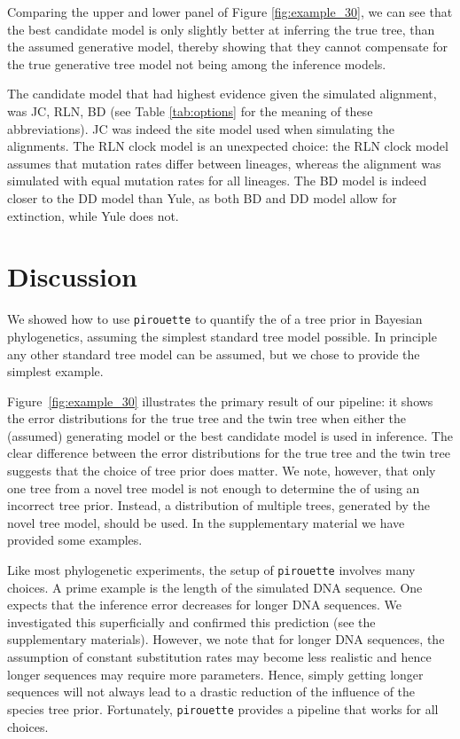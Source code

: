 Comparing the upper and lower panel of Figure \ref{fig:example_30}, 
we can see that the best
candidate model is only slightly better at inferring the true tree,
than the assumed generative model, 
thereby showing that they cannot compensate 
for the true generative tree model not being among the inference models.

The candidate model that had highest evidence given the simulated alignment,
was JC, RLN, BD (see Table \ref{tab:options} for the meaning of these 
abbreviations). JC was indeed the site model used when simulating the
alignments. The RLN clock model is an unexpected choice: the RLN clock
model assumes that mutation rates differ between lineages, whereas the
alignment was simulated with equal mutation rates for all lineages.
The BD model is indeed closer to the DD model than Yule, as both BD and DD
model allow for extinction, while Yule does not.

\section{Discussion}

We showed how to use \verb;pirouette; to quantify the  of a 
tree prior in Bayesian phylogenetics, assuming the simplest standard 
tree model possible.
In principle any other standard tree model can be assumed, 
but we chose to provide the simplest example.

Figure~\ref{fig:example_30} illustrates the primary result of our pipeline: 
it shows the error distributions for the true tree and the twin tree 
when either the (assumed) generating model or the best candidate model is used in inference. 
The clear difference between the error distributions 
for the true tree and the twin tree suggests 
that the choice of tree prior does matter.
We note, however, that only one tree from a novel tree model
is not enough to determine the  of using an incorrect
tree prior. Instead, a distribution 
of multiple trees, generated by the novel tree model, should be used. In the supplementary material we have provided some examples.

Like most phylogenetic experiments, the setup of \verb;pirouette;
involves many choices. A prime example is the
length of the simulated DNA sequence. One expects that the inference error
decreases for longer DNA sequences. We investigated this
superficially and confirmed this prediction (see the supplementary materials). 
However, we note that for longer DNA sequences, the assumption 
of constant substitution rates may become less realistic 
and hence longer sequences may require more parameters. 
Hence, simply getting longer sequences will not always lead to a drastic 
reduction of the influence of the species tree prior.
Fortunately, \verb;pirouette; provides a pipeline that works for all choices.

